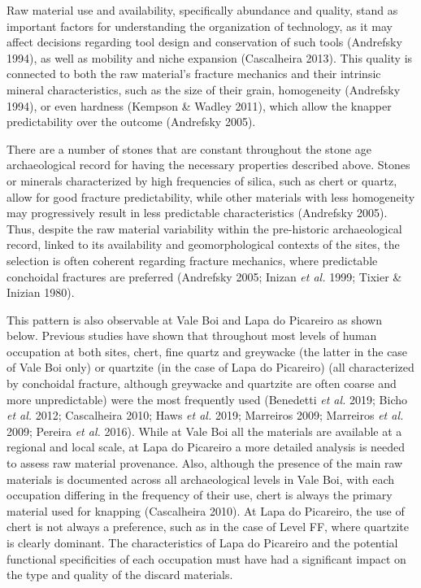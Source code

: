 \documentclass[12pt,twoside]{reedthesis}
\begin{document}
Raw material use and availability, specifically abundance and quality, stand as important factors for understanding the organization of technology, as it may affect decisions regarding tool design and conservation of such tools (Andrefsky 1994), as well as mobility and niche expansion (Cascalheira 2013). This quality is connected to both the raw material's fracture mechanics and their intrinsic mineral characteristics, such as the size of their grain, homogeneity (Andrefsky 1994), or even hardness (Kempson \& Wadley 2011), which allow the knapper predictability over the outcome (Andrefsky 2005).

There are a number of stones that are constant throughout the stone age archaeological record for having the necessary properties described above. Stones or minerals characterized by high frequencies of silica, such as chert or quartz, allow for good fracture predictability, while other materials with less homogeneity may progressively result in less predictable characteristics (Andrefsky 2005). Thus, despite the raw material variability within the pre-historic archaeological record, linked to its availability and geomorphological contexts of the sites, the selection is often coherent regarding fracture mechanics, where predictable conchoidal fractures are preferred (Andrefsky 2005; Inizan \emph{et al.} 1999; Tixier \& Inizian 1980).

This pattern is also observable at Vale Boi and Lapa do Picareiro as shown below. Previous studies have shown that throughout most levels of human occupation at both sites, chert, fine quartz and greywacke (the latter in the case of Vale Boi only) or quartzite (in the case of Lapa do Picareiro) (all characterized by conchoidal fracture, although greywacke and quartzite are often coarse and more unpredictable) were the most frequently used (Benedetti \emph{et al.} 2019; Bicho \emph{et al.} 2012; Cascalheira 2010; Haws \emph{et al.} 2019; Marreiros 2009; Marreiros \emph{et al.} 2009; Pereira \emph{et al.} 2016). While at Vale Boi all the materials are available at a regional and local scale, at Lapa do Picareiro a more detailed analysis is needed to assess raw material provenance. Also, although the presence of the main raw materials is documented across all archaeological levels in Vale Boi, with each occupation differing in the frequency of their use, chert is always the primary material used for knapping (Cascalheira 2010). At Lapa do Picareiro, the use of chert is not always a preference, such as in the case of Level FF, where quartzite is clearly dominant. The characteristics of Lapa do Picareiro and the potential functional specificities of each occupation must have had a significant impact on the type and quality of the discard materials.
\end{document}
